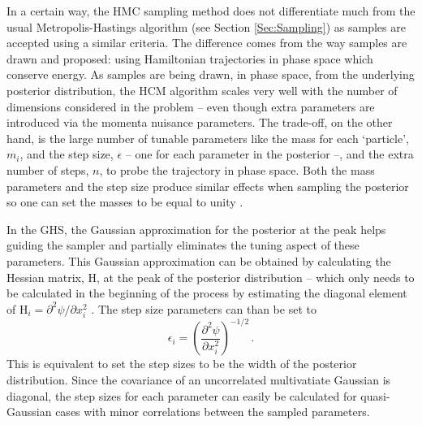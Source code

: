 \qquad In a certain way, the HMC sampling method does not differentiate much from the usual Metropolis-Hastings algorithm (see Section \ref{Sec:Sampling}) as samples are accepted using a similar criteria. The difference comes from the way samples are drawn and proposed: using Hamiltonian trajectories in phase space which conserve energy. As samples are being drawn, in phase space, from the underlying posterior distribution, the HCM algorithm scales very well with the number of dimensions considered in the problem -- even though extra parameters are introduced via the momenta nuisance parameters. The trade-off, on the other hand, is the large number of tunable parameters like the mass for each  `particle', $m_i$, and the step size, $\epsilon$ -- one for each parameter in the posterior --, and the extra number of steps, $n$, to probe the trajectory in phase space. Both the mass parameters and the step size produce similar effects when sampling the posterior so one can set the masses to be equal to unity \citep{Neal1996}. 

\qquad In the GHS, the Gaussian approximation for the posterior at the peak helps guiding the sampler and partially eliminates the tuning aspect of these parameters. This Gaussian approximation can be obtained by calculating the Hessian matrix, $\bm{\mathrm{H}}$, at the peak of the posterior distribution -- which only needs to be calculated in the beginning of the process by estimating the diagonal element of $\mathrm{H}_i = \partial^2 \psi/\partial x_i^2$ \citep{SreeThesis,2013-GuidedHamiltonian}. The step size parameters can than be set to
\begin{equation}
    \label{Eq:BPL:StepSizeVector}
    \epsilon_i = \left( \frac{\partial^2 \psi}{\partial x_i^2}\right)^{-1/2}\, .
\end{equation}
This is equivalent to set the step sizes to be the width of the posterior distribution. Since the covariance of an uncorrelated multivatiate Gaussian is diagonal, the step sizes for each parameter can easily be calculated for quasi-Gaussian cases with minor correlations between the sampled parameters. 

